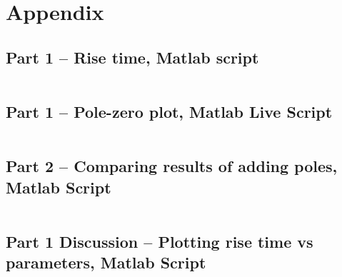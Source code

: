 \documentclass[12pt]{article}
\begin{document}
\newpage
\appendix
\section{Appendix}

\subsection{Part 1 -- Rise time, Matlab script}\label{sap:solving for .9cf and .1cf}
\inputminted{matlab}{src/part01a_rise_time.m}

\subsection{Part 1 -- Pole-zero plot, Matlab Live Script}\label{sap:pzplot}
\inputminted{matlab}{src/part01a_pzplot_mlx.m}

\subsection{Part 2 -- Comparing results of adding poles, Matlab Script}\label{sap:adding poles}
\inputminted{matlab}{src/part02_adding_poles.m}

\subsection{Part 1 Discussion -- Plotting rise time vs parameters, Matlab Script}\label{sap:rise time vs parameters}
\inputminted{matlab}{src/part01_rise_time_vs_parameters_plot.m}
\end{document}
